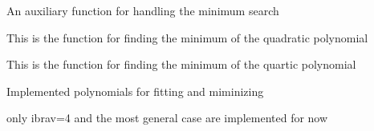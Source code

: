 \documentclass[letterpaper,10pt,english]{sphinxmanual}
\begin{document}

\begin{fulllineitems}
\label{pyqha:pyqha.minutils.find_min}
An auxiliary function for handling the minimum search

\end{fulllineitems}


\begin{fulllineitems}
\label{pyqha:pyqha.minutils.find_min_quadratic}
This is the function for finding the minimum of the quadratic polynomial

\end{fulllineitems}


\begin{fulllineitems}
\label{pyqha:pyqha.minutils.find_min_quartic}
This is the function for finding the minimum of the quartic polynomial

\end{fulllineitems}


\begin{fulllineitems}
\label{pyqha:pyqha.minutils.fquadratic}
Implemented polynomials for fitting and miminizing

only ibrav=4 and the most general case are implemented for now

\end{fulllineitems}


\begin{fulllineitems}
\label{pyqha:pyqha.minutils.fquadratic_der}
\end{fulllineitems}
\end{document}
